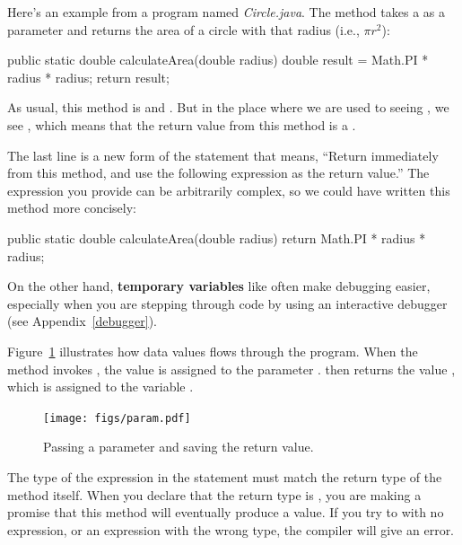 Here's an example from a program named {\it Circle.java}.
The  method takes a  as a parameter and returns the area of a circle with that radius (i.e., $\pi r^2$):

\begin{code}
public static double calculateArea(double radius) {
    double result = Math.PI * radius * radius;
    return result;
}
\end{code}

As usual, this method is  and .
But in the place where we are used to seeing , we see , which means that the return value from this method is a .


The last line is a new form of the  statement that means, ``Return immediately from this method, and use the following expression as the return value.''
The expression you provide can be arbitrarily complex, so we could have written this method more concisely:

\begin{code}
public static double calculateArea(double radius) {
    return Math.PI * radius * radius;
}
\end{code}


On the other hand, {\bf temporary variables} like  often make debugging easier, especially when you are stepping through code by using an interactive debugger (see Appendix~\ref{debugger}).

Figure~\ref{fig.param} illustrates how data values flows through the program.
When the  method invokes , the value  is assigned to the parameter .
 then returns the value , which is assigned to the variable .

\begin{figure}[!ht]
\begin{center}
\texttt{[image: figs/param.pdf]}
\caption{Passing a parameter and saving the return value.}
\label{fig.param}
\end{center}
\end{figure}

The type of the expression in the  statement must match the return type of the method itself.
When you declare that the return type is , you are making a promise that this method will eventually produce a  value.
If you try to  with no expression, or  an expression with the wrong type, the compiler will give an error.


